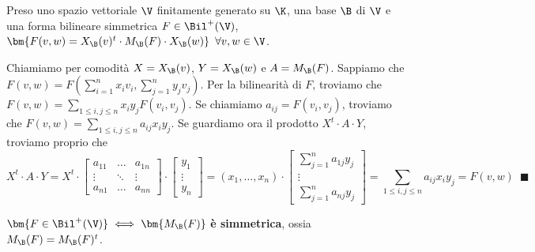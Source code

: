 \documentclass[11pt, a4paper, titlepage, oneside]{scrbook}
\begin{document}
\begin{Proposizione}[]
\label{propos-matrice-gram-prodotto}
Preso uno spazio vettoriale $\V$ finitamente generato su $\K$, una base $\B$ di $\V$ e una forma bilineare simmetrica $F \in \Bil^+(\V)$, $\bm{F(v,w) = X_\B(v)^t \cdot M_\B(F) \cdot X_\B(w)} \enspace \forall v,w \in \V$.
\end{Proposizione}

\Dimostrazione \nopagebreak

Chiamiamo per comodità $X = X_\B(v)$, $Y = X_\B(w)$ e $A = M_\B(F)$. Sappiamo che \mbox{$F(v,w) = F(\sum_{i = 1}^n x_i v_i, \sum_{j = 1}^n y_j v_j)$}. Per la bilinearità di $F$, troviamo che $F(v,w) = \sum_{1 \leq i,j \leq n} x_i y_j F(v_i, v_j)$. Se chiamiamo $a_{ij} = F(v_i, v_j)$, troviamo che $F(v,w) = \sum_{1 \leq i,j \leq n} a_{ij} x_i y_j$. Se guardiamo ora il prodotto $X^t \cdot A \cdot Y$, troviamo proprio che 
\[
X^t \cdot A \cdot Y = X^t \cdot \begin{bmatrix}
    a_{11} & \dots & a_{1n} \\
    \vdots & \ddots & \vdots \\
    a_{n1} & \dots & a_{nn} 
\end{bmatrix}
\cdot \begin{bmatrix}
    y_1 \\
    \vdots \\
    y_n 
\end{bmatrix} = (x_1, \ldots, x_n) \cdot \begin{bmatrix}
    \sum_{j = 1}^n a_{1j} y_j \\
     \vdots \\
     \sum_{j = 1}^n a_{nj} y_j 
\end{bmatrix} = \sum_{1 \leq i,j \leq n} a_{ij} x_i y_j = F(v,w) \enspace \blacksquare
\]

\begin{Osservazione}[]
\label{oss-F bilineare simmetrica- MB simmetrica}
$\bm{F \in \Bil^+(\V)} \iff \bm{M_\B(F)}$ \textbf{è simmetrica}, ossia $M_\B(F) = M_\B(F)^t$.
\end{Osservazione}

\Dimostrazione \nopagebreak
\end{document}
